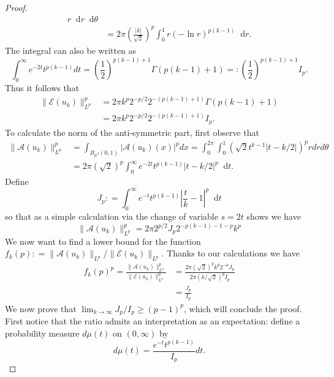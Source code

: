 \documentclass[11pt, a4paper]{amsart}
\theoremstyle{definition}
\theoremstyle{remark}
\newcommand{\R}{\mathbb{R}}
\newcommand*\diff{\mathop{}\!\mathrm{d}}
\newcommand{\abs}[1]{|#1|}
\newcommand{\norm}[1]{\|#1\|}
\begin{document}
\begin{proof}
\begin{align*}
r \diff r \diff \theta\\&
= 2\pi \left(\frac{\abs{k}}{\sqrt{2}}\right)^p
\int_0^1 r (-\ln r)^{p(k-1)} \diff r.
\end{align*}
The integral can also be written as
\begin{equation*}
\int_0^\infty e^{-2t} t^{p(k-1)} dt =
\left(\frac{1}{2}\right)^{p(k-1)+1}
\Gamma(p(k-1)+1)
=\mathrel{:}\left(\frac{1}{2}\right)^{p(k-1)+1}I_p.
\end{equation*}
Thus it follows that
\begin{align*}
\norm{\mathcal E(u_k)}_{L^p}^p
&= 2\pi k^p 2^{-p/2} 2^{-(p(k-1)+1)}
\Gamma(p(k-1)+1)\\
&=2\pi k^p 2^{-p/2} 2^{-(p(k-1)+1)} I_p.
\end{align*}
To calculate the norm of the anti-symmetric part,
first observe that 
\begin{align*}
\norm{\mathcal A(u_k)}_{L^p}^p& =
\int_{B_{\R^2}(0,1)} \abs{\mathcal A(u_k)(x)}^p dx
= \int_0^{2\pi} \int_0^1
\left(
\sqrt{2} t^{k-1} \abs{t - k/2}
\right)^p r dr d\theta\\
&= 2\pi (\sqrt{2})^p\int_0^\infty e^{-2t} t^{p(k-1)}
\abs{t - k/2}^p \diff t.
\end{align*}
Define 
\begin{equation*}
J_p\mathrel{:}=\int_0^\infty e^{-t} t^{p(k-1)}
\left|\frac tk - 1\right|^p\diff t
\end{equation*}
so that as a simple calculation via the
change of variable $s=2t$ shows we have
\begin{equation*}
\norm{\mathcal A(u_k)}_{L^p}^p
=2\pi 2^{p/2} J_p 2^{-p(k-1)-1-p}k^p
\end{equation*}
We now want to find a lower bound for the function
$f_k(p) \mathrel{:}=
\norm{\mathcal A(u_k)}_{L^p}/
\norm{\mathcal E(u_k)}_{L^p}$.
Thanks to our calculations we have
\begin{align}
f_k(p)^p = \frac{\norm{\mathcal A(u_k)}_{L^p}^p}
{\norm{\mathcal E(u_k)}_{L^p}^p}
&= \frac{2\pi (\sqrt{2})^p k^p2^{-p} J_p}
{2\pi (k/\sqrt{2})^p I_p}
\nonumber \\
&= \frac{J_p}{I_p} \label{eq:fk_ratio} 
\end{align}
We now prove that $\lim_{k\to \infty} J_p/I_p\ge (p-1)^p$,
which will conclude the proof.
First notice that the ratio admits
an interpretation as an expectation: 
define a probability measure
$d\mu(t)$ on $(0, \infty)$ by
\begin{equation}
 d\mu(t) = \frac{e^{-t} t^{p(k-1)}}{I_p} dt. 
\end{equation}

\end{proof}
\end{document}

